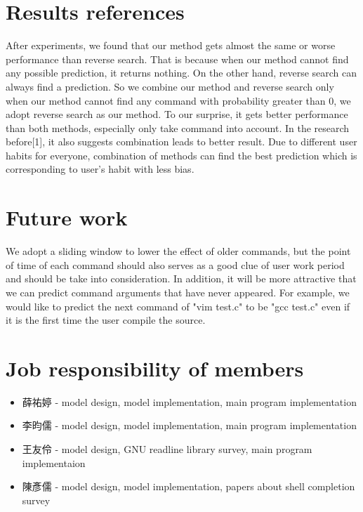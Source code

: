 \documentclass[11pt,a4paper]{article}
\begin{document}
\section*{Results references}
After experiments, we found that our method gets almost the same or worse performance than reverse search. 
That is because when our method cannot find any possible prediction, it returns nothing.
On the other hand, reverse search can always find a prediction.
So we combine our method and reverse search only when our method cannot find any command with probability greater than 0,
we adopt reverse search as our method. 
To our surprise, it gets better performance than both methods, especially only take command into account. 
In the research before[1], it also suggests combination leads to better result. 
Due to different user habits for everyone, 
combination of methods can find the best prediction which is corresponding to user's habit with less bias.

\section*{Future work}
We adopt a sliding window to lower the effect of older commands, but the point of time of each command should also serves as a good clue of user work period and should be take into consideration.
In addition, it will be more attractive that we can predict command arguments that have never appeared. For example, we would like to predict the next command of "vim test.c" to be "gcc test.c" even if it is the first time the user compile the source.

\section*{Job responsibility of members}

\begin{CJK}{UTF8}{bsmi}
\begin{itemize}
\item 薛祐婷 - model design, model implementation, main program implementation
\item 李昀儒 - model design, model implementation, main program implementation
\item 王友伶 - model design, GNU readline library survey, main program implementaion
\item 陳彥儒 - model design, model implementation, papers about shell completion survey
\end{itemize}
\end{CJK}
\end{document}
